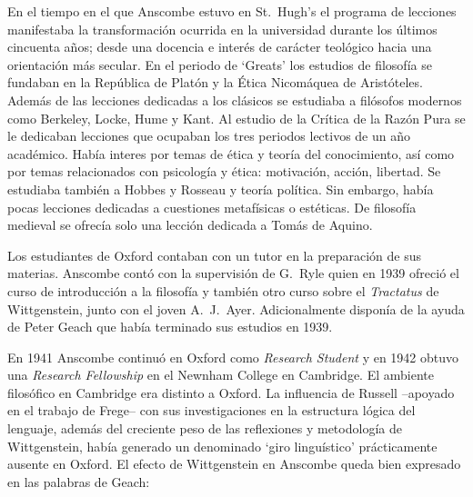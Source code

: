 En el tiempo en el que Anscombe estuvo en St.~Hugh's el programa de lecciones
manifestaba la transformación ocurrida en la universidad durante los últimos
cincuenta años; desde una docencia e interés de carácter teológico hacia una
orientación más secular. En el periodo de `Greats' los estudios de filosofía se
fundaban en la República de Platón y la Ética Nicomáquea de Aristóteles. Además
de las lecciones dedicadas a los clásicos se estudiaba a filósofos modernos como
Berkeley, Locke, Hume y Kant. Al estudio de la Crítica de la Razón Pura se le
dedicaban lecciones que ocupaban los tres periodos lectivos de un año académico.
Había interes por temas de ética y teoría del conocimiento, así como por temas
relacionados con psicología y ética: motivación, acción, libertad. Se estudiaba
también a Hobbes y Rosseau y teoría política. Sin embargo, había pocas lecciones
dedicadas a cuestiones metafísicas o estéticas. De filosofía medieval se ofrecía
solo una lección dedicada a Tomás de Aquino.\autocite[cf.~][pp.~23-24]{accint}

Los estudiantes de Oxford contaban con un tutor en la preparación de sus
materias. Anscombe contó con la supervisión de G.~Ryle quien en 1939 ofreció el
curso de introducción a la filosofía y también otro curso sobre el
\emph{Tractatus} de Wittgenstein, junto con el joven A.~J.~Ayer. Adicionalmente
disponía de la ayuda de Peter Geach que había terminado sus estudios en
1939.\autocite[cf.~][p.~24]{accint}

En 1941 Anscombe continuó en Oxford como \emph{Research Student} y en 1942
obtuvo una \emph{Research Fellowship} en el Newnham College en Cambridge. El
ambiente filosófico en Cambridge era distinto a Oxford. La influencia de Russell
--apoyado en el trabajo de Frege-- con sus investigaciones en la estructura
lógica del lenguaje, además del creciente peso de las reflexiones y metodología
de Wittgenstein, había generado un denominado `giro
linguístico'\autocite[cf.~][p.14]{phiaut} prácticamente ausente en Oxford. El
efecto de Wittgenstein en Anscombe queda bien expresado en las palabras de
Geach: 

